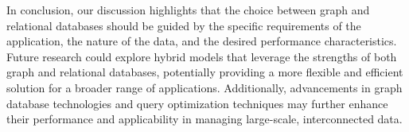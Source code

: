 In conclusion, our discussion highlights that the choice between graph and relational databases should be guided by the specific requirements of the application, the nature of the data, and the desired performance characteristics. Future research could explore hybrid models that leverage the strengths of both graph and relational databases, potentially providing a more flexible and efficient solution for a broader range of applications. Additionally, advancements in graph database technologies and query optimization techniques may further enhance their performance and applicability in managing large-scale, interconnected data.




